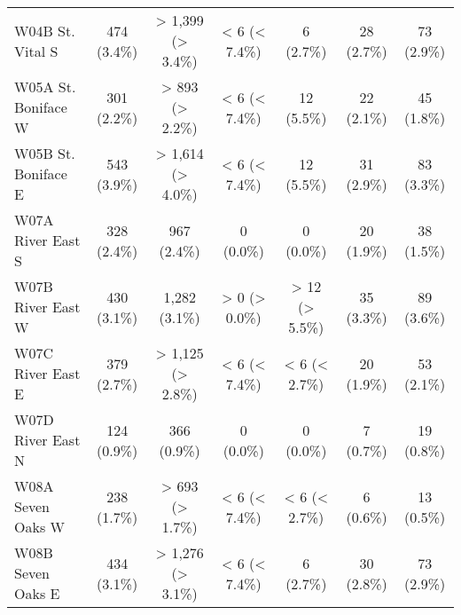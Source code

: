 \documentclass{article}
\begin{document}
\begin{table}[htbp]
\begin{tabular}{l*{6}{c}}
  W04B St. Vital S                                      &           474 (3.4\%)           &        > 1,399 (> 3.4\%)        &          < 6 (< 7.4\%)          &            6 (2.7\%)            &            28 (2.7\%)           &            73 (2.9\%)           \\
  W05A St. Boniface W                                   &           301 (2.2\%)           &         > 893 (> 2.2\%)         &          < 6 (< 7.4\%)          &            12 (5.5\%)           &            22 (2.1\%)           &            45 (1.8\%)           \\
  W05B St. Boniface E                                   &           543 (3.9\%)           &        > 1,614 (> 4.0\%)        &          < 6 (< 7.4\%)          &            12 (5.5\%)           &            31 (2.9\%)           &            83 (3.3\%)           \\
  W07A River East S                                     &           328 (2.4\%)           &           967 (2.4\%)           &            0 (0.0\%)            &            0 (0.0\%)            &            20 (1.9\%)           &            38 (1.5\%)           \\
  W07B River East W                                     &           430 (3.1\%)           &          1,282 (3.1\%)          &          > 0 (> 0.0\%)          &          > 12 (> 5.5\%)         &            35 (3.3\%)           &            89 (3.6\%)           \\
  W07C River East E                                     &           379 (2.7\%)           &        > 1,125 (> 2.8\%)        &          < 6 (< 7.4\%)          &          < 6 (< 2.7\%)          &            20 (1.9\%)           &            53 (2.1\%)           \\
  W07D River East N                                     &           124 (0.9\%)           &           366 (0.9\%)           &            0 (0.0\%)            &            0 (0.0\%)            &            7 (0.7\%)            &            19 (0.8\%)           \\
  W08A Seven Oaks W                                     &           238 (1.7\%)           &         > 693 (> 1.7\%)         &          < 6 (< 7.4\%)          &          < 6 (< 2.7\%)          &            6 (0.6\%)            &            13 (0.5\%)           \\
  W08B Seven Oaks E                                     &           434 (3.1\%)           &        > 1,276 (> 3.1\%)        &          < 6 (< 7.4\%)          &            6 (2.7\%)            &            30 (2.8\%)           &            73 (2.9\%)           \\

\end{tabular}
\end{table}
\end{document}

